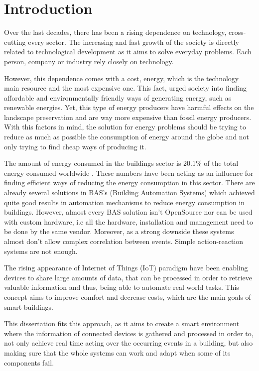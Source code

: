 

\chapter{Introduction}
\label{chapter:introduction}

Over the last decades, there has been a rising dependence on technology, cross-cutting every sector. The increasing and fast growth of the society is directly related to technological development as it aims to solve everyday problems. Each person, company or industry rely closely on technology.


However, this dependence comes with a cost, energy, which is the technology main resource and the most expensive one. This fact, urged society into finding affordable and environmentally friendly ways of generating energy, such as renewable energies. Yet, this type of energy producers have harmful effects on the landscape preservation and are way more expensive than fossil energy producers. With this factors in mind, the solution for energy problems should be trying to reduce as much as possible the consumption of energy around the globe and not only trying to find cheap ways of producing it.

The amount of energy consumed in the buildings sector is 20.1\% of the total energy consumed worldwide \cite{BuildingEnergy}. These numbers have been acting as an influence for finding efficient ways of reducing the energy consumption in this sector. There are already several solutions in BAS's (Building Automation Systems) which achieved quite good results in automation mechanisms to reduce energy consumption in buildings. However, almost every BAS solution isn't OpenSource nor can be used with custom hardware, i.e all the hardware, installation and management need to be done by the same vendor. Moreover, as a strong downside these systems almost don't allow complex correlation between events. Simple action-reaction systems are not enough.

The rising appearance of Internet of Things (IoT) paradigm have been enabling devices to share large amounts of data, that can be processed in order to retrieve valuable information and thus, being able to automate real world tasks. This concept aims to improve comfort and decrease costs, which are the main goals of smart buildings.

This dissertation fits this approach, as it aims to create a smart environment where the information of connected devices is gathered and processed in order to, not only achieve real time acting over the occurring events in a building, but also making sure that the whole systems can work and adapt when some of its components fail.

